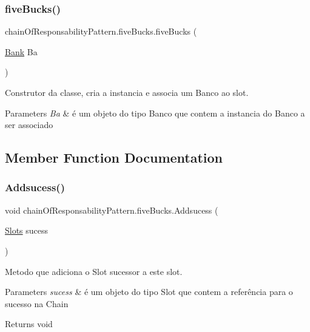\subsubsection{\texorpdfstring{fiveBucks()}{fiveBucks()}}
{\footnotesize\ttfamily chain\+Of\+Responsability\+Pattern.\+five\+Bucks.\+five\+Bucks (\begin{DoxyParamCaption}\item[{\mbox{\hyperlink{classmediator_pattern_1_1_bank}{Bank}}}]{Ba }\end{DoxyParamCaption})}



Construtor da classe, cria a instancia e associa um Banco ao slot. 


\begin{DoxyParams}{Parameters}
{\em Ba} & é um objeto do tipo Banco que contem a instancia do Banco a ser associado \\
\hline
\end{DoxyParams}


\subsection{Member Function Documentation}
\mbox{\label{classchain_of_responsability_pattern_1_1five_bucks_a13552adac1bece0a272a67a20727a52c}} 
\subsubsection{\texorpdfstring{Addsucess()}{Addsucess()}}
{\footnotesize\ttfamily void chain\+Of\+Responsability\+Pattern.\+five\+Bucks.\+Addsucess (\begin{DoxyParamCaption}\item[{\mbox{\hyperlink{interfacechain_of_responsability_pattern_1_1_slots}{Slots}}}]{sucess }\end{DoxyParamCaption})}



Metodo que adiciona o Slot sucessor a este slot. 


\begin{DoxyParams}{Parameters}
{\em sucess} & é um objeto do tipo Slot que contem a referência para o sucesso na Chain \\
\hline
\end{DoxyParams}
\begin{DoxyReturn}{Returns}
void 
\end{DoxyReturn}
\mbox{\label{classchain_of_responsability_pattern_1_1five_bucks_a2965b1e5ea534dbe4148a5b69d13f1a6}} 
